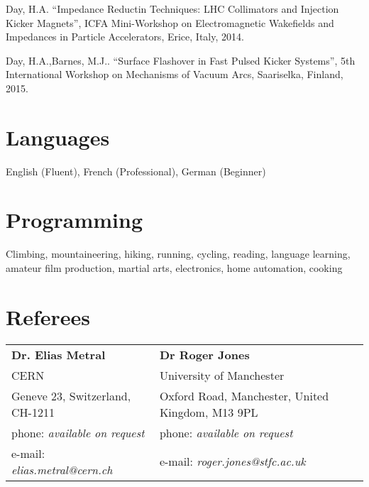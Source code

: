 \documentclass[margin,line]{resume}
\begin{document}
\begin{resume}
	Day, H.A.
    ``Impedance Reductin Techniques: LHC Collimators and Injection Kicker Magnets'',
    ICFA Mini-Workshop on Electromagnetic Wakefields and Impedances in Particle Accelerators, Erice, Italy, 2014.

	Day, H.A.,Barnes, M.J..
    ``Surface Flashover in Fast Pulsed Kicker Systems'',
    5th International Workshop on Mechanisms of Vacuum Arcs, Saariselka, Finland, 2015.


    \section{\mysidestyle Languages} 

   English (Fluent), French (Professional), German (Beginner)


    \section{\mysidestyle Programming} 

    Climbing, mountaineering, hiking, running, cycling, reading, language learning, amateur film production, martial arts, electronics, home automation, cooking






\section{\mysidestyle Referees} 

\begin{tabular}{@{}p{6cm}p{6cm}}
\textbf{Dr. Elias Metral}       &  \textbf{Dr Roger Jones}                   \\
CERN                     &  University of Manchester                      \\
Geneve 23, Switzerland, CH-1211           &  Oxford Road, Manchester, United Kingdom, M13 9PL        \\
phone: \textsl{available on request}    &  phone: \textsl{available on request}     \\
e-mail: \textsl{elias.metral@cern.ch}   &  e-mail: \textsl{roger.jones@stfc.ac.uk}    \\
\end{tabular}


\end{resume}
\end{document}

